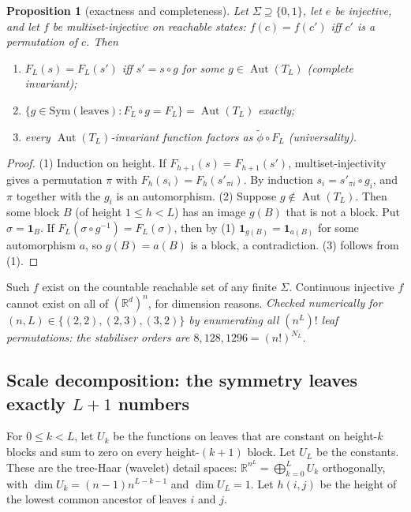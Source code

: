 \documentclass[11pt]{article}
\newtheorem{proposition}[theorem]{Proposition}
\theoremstyle{definition}
\newcommand{\R}{\mathbb{R}}
\newcommand{\Aut}{\operatorname{Aut}}
\newcommand{\Nint}{N_{L}}
\begin{document}
\begin{proposition}[exactness and completeness]\label{prop:exact}
Let $\Sigma\supseteq\{0,1\}$, let $e$ be injective, and let $f$ be \emph{multiset-injective}
on reachable states: $f(c)=f(c')$ iff $c'$ is a permutation of $c$. Then
\begin{enumerate}
\item $F_L(s)=F_L(s')$ iff $s'=s\circ g$ for some $g\in\Aut(T_L)$ (complete invariant);
\item $\{g\in\mathrm{Sym}(\text{leaves}):F_L\circ g=F_L\}=\Aut(T_L)$ exactly;
\item every $\Aut(T_L)$-invariant function factors as $\tilde\phi\circ F_L$ (universality).
\end{enumerate}
\end{proposition}
\begin{proof}
(1) Induction on height. If $F_{h+1}(s)=F_{h+1}(s')$, multiset-injectivity gives a permutation
$\pi$ with $F_h(s_i)=F_h(s'_{\pi i})$. By induction $s_i=s'_{\pi i}\circ g_i$, and $\pi$
together with the $g_i$ is an automorphism.
(2) Suppose $g\notin\Aut(T_L)$. Then some block $B$ (of height $1\le h<L$) has an image $g(B)$
that is not a block. Put $\sigma=\mathbf 1_B$. If $F_L(\sigma\circ g^{-1})=F_L(\sigma)$, then
by (1) $\mathbf 1_{g(B)}=\mathbf 1_{a(B)}$ for some automorphism $a$, so $g(B)=a(B)$ is a block,
a contradiction.
(3) follows from (1).
\end{proof}
Such $f$ exist on the countable reachable set of any finite $\Sigma$. Continuous injective $f$
cannot exist on all of $(\R^d)^n$, for dimension reasons. \emph{Checked numerically for
$(n,L)\in\{(2,2),(2,3),(3,2)\}$ by enumerating all $(n^L)!$ leaf permutations: the stabiliser
orders are $8,128,1296=(n!)^{\Nint}$.}

\subsection{Scale decomposition: the symmetry leaves exactly \texorpdfstring{$L+1$}{L+1} numbers}
For $0\le k<L$, let $U_k$ be the functions on leaves that are constant on height-$k$ blocks and
sum to zero on every height-$(k{+}1)$ block. Let $U_L$ be the constants. These are the tree-Haar
(wavelet) detail spaces: $\R^{n^L}=\bigoplus_{k=0}^{L}U_k$ orthogonally, with
$\dim U_k=(n-1)n^{L-k-1}$ and $\dim U_L=1$. Let $h(i,j)$ be the height of the lowest common
ancestor of leaves $i$ and $j$.
\end{document}
